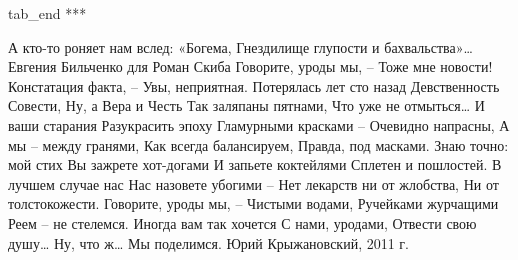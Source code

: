   tab_end
\fi
***

А кто-то роняет нам вслед: «Богема,
Гнездилище глупости и бахвальства»…
Евгения Бильченко для Роман Скиба 
Говорите, уроды мы, –
Тоже мне новости!
Констатация факта, –
Увы, неприятная.
Потерялась лет сто назад
Девственность Совести,
Ну, а Вера и Честь
Так заляпаны пятнами,
Что уже не отмыться…
И ваши старания
Разукрасить эпоху
Гламурными красками –
Очевидно напрасны,
А мы – между гранями,
Как всегда балансируем,
Правда, под масками.
Знаю точно: мой стих
Вы зажрете хот-догами
И запьете коктейлями
Сплетен и пошлостей.
В лучшем случае нас
Нас назовете убогими –
Нет лекарств ни от жлобства,
Ни от толстокожести.
Говорите, уроды мы, –
Чистыми водами,
Ручейками журчащими
Реем – не стелемся.
Иногда вам так хочется
С нами, уродами,
Отвести свою душу…
Ну, что ж… Мы поделимся.
Юрий Крыжановский, 2011 г.
